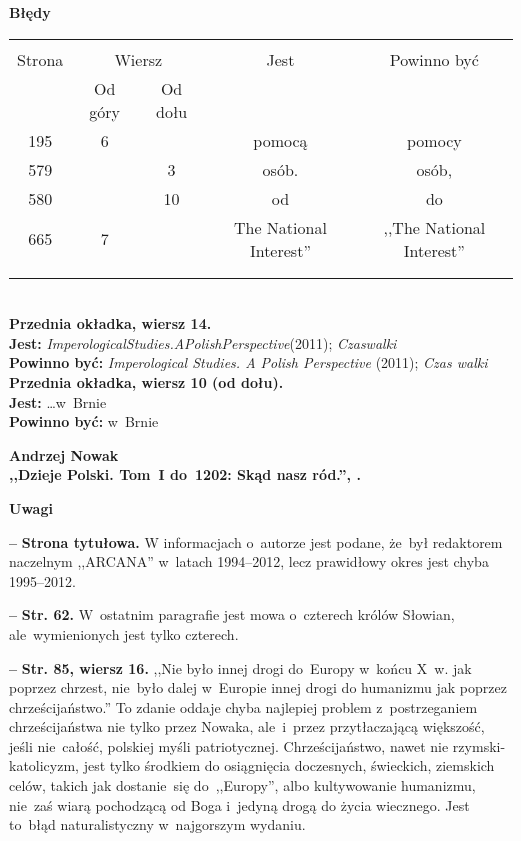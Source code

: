 \documentclass[a4paper,11pt]{article}
\newcommand{\spaceOne}{2em}
\newcommand{\tb}{\textbf}
\newcommand{\noi}{\noindent}
\newcommand{\start}{\noi \tb{--} {}}
\newcommand{\Center}[1]{\begin{center} #1 \end{center}}
\newcommand{\CenterTB}[1]{\Center{\tb{#1}}}
\newcommand{\Str}[1]{\tb{Str. #1.}}
\newcommand{\StrWg}[2]{\tb{Str. #1, wiersz #2.}}
\newcommand{\Jest}{\tb{Jest: }}
\newcommand{\Pow}{\tb{Powinno być: }}
\newcommand{\Work}[1]{ \begin{center} {\large \tb{#1}} \end{center} }
\begin{document}
\CenterTB{Błędy}
\begin{center}
  \begin{tabular}{|c|c|c|c|c|}
    \hline
    & \multicolumn{2}{c|}{} & & \\
    Strona & \multicolumn{2}{c|}{Wiersz}& Jest & Powinno być \\ \cline{2-3}
    & Od góry & Od dołu &  &  \\ \hline
    195 & 6 & & pomocą & pomocy \\
    579 & & 3 & osób. & osób, \\
    580 & & 10 & od & do \\
    665 & 7 & & The National Interest'' & ,,The National Interest'' \\
    & & & & \\
    & & & & \\ \hline
  \end{tabular}
\end{center}
\noi \\
\tb{Przednia okładka, wiersz 14.}\\
\Jest \emph{ImperologicalStudies.APolishPerspective}(2011);
\emph{Czaswalki} \\
\Pow \emph{Imperological Studies. A Polish Perspective} (2011);
\emph{Czas walki} \\
\tb{Przednia okładka, wiersz 10 (od dołu).}\\
\Jest \ldots w~Brnie \\
\Pow w~Brnie \\

\vspace{\spaceOne}



\Work{
  Andrzej Nowak \\
  ,,Dzieje Polski. Tom~I do~1202: Skąd nasz ród.'', \cite{Now14a}.}


\CenterTB{Uwagi}

\start \tb{Strona tytułowa.} W informacjach o~autorze jest podane,
że~był redaktorem naczelnym ,,ARCANA'' w~latach 1994--2012, lecz
prawidłowy okres jest chyba 1995--2012.

\start \Str{62} W~ostatnim paragrafie jest mowa o~czterech królów
Słowian, ale~wymienionych jest tylko czterech.

\start \StrWg{85}{16} ,,Nie było innej drogi do~Europy w~końcu X~w.
jak poprzez chrzest, nie~było dalej w~Europie innej drogi do humanizmu
jak poprzez chrześcijaństwo.'' To zdanie oddaje chyba najlepiej
problem z~postrzeganiem chrześcijaństwa nie tylko przez Nowaka,
ale~i~przez przytłaczającą większość, jeśli nie~całość, polskiej myśli
patriotycznej. Chrześcijaństwo, nawet nie rzymski-katolicyzm, jest
tylko środkiem do osiągnięcia doczesnych, świeckich, ziemskich celów,
takich jak dostanie~się do~,,Europy'', albo kultywowanie humanizmu,
nie~zaś wiarą pochodzącą od Boga i~jedyną drogą do życia wiecznego.
Jest to~błąd naturalistyczny w~najgorszym wydaniu.
\end{document}
